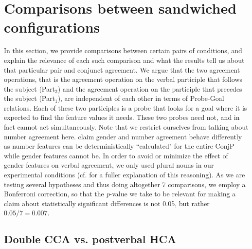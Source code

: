 \documentclass[output=paper
,modfonts
,nonflat]{langsci/langscibook}
\begin{document}
\section{Comparisons between sandwiched configurations}\largerpage[2]

In this section, we provide comparisons between certain pairs of conditions, and explain the relevance of each such comparison and what the results tell us about that particular pair and conjunct agreement. We argue that the two agreement operations, that is the agreement operation on the verbal participle that follows the subject (Part$_2$) and the agreement operation on the participle that precedes the subject (Part$_1$), are independent of each other in terms of Probe-Goal relations. Each of these two participles is a probe that looks for a goal where it is expected to find the feature values it needs. These two probes need not, and in fact cannot act simultaneously. Note that we restrict ourselves from talking about number agreement here. \cite{marusicnevinsbadecker:15} claim gender and number agreement behave differently as number features can be deterministically ``calculated" for the entire ConjP while gender features cannot be. In order to avoid or minimize the effect of gender features on verbal agreement, we only used plural nouns in our experimental conditions (cf. \citealt{marusicnevinsbadecker:15} for a fuller explanation of this reasoning). As we are testing several hypotheses and thus doing altogether 7 comparisons, we employ a Bonferroni correction, so that the \textit{p}-value we take to be relevant for making a claim about statistically significant differences is not 0.05, but rather $0.05/7 = 0.007$.

\subsection{Double CCA vs. postverbal HCA}
\end{document}
